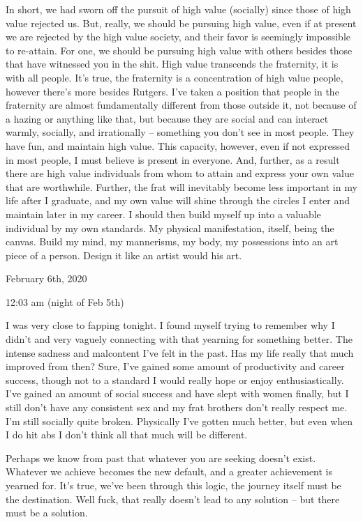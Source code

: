 In short, we had sworn off the pursuit of high value (socially) since
those of high value rejected us. But, really, we should be pursuing high
value, even if at present we are rejected by the high value society, and
their favor is seemingly impossible to re-attain. For one, we should be
pursuing high value with others besides those that have witnessed you in
the shit. High value transcends the fraternity, it is with all people.
It's true, the fraternity is a concentration of high value people,
however there's more besides Rutgers. I've taken a position that people
in the fraternity are almost fundamentally different from those outside
it, not because of a hazing or anything like that, but because they are
social and can interact warmly, socially, and irrationally -- something
you don't see in most people. They have fun, and maintain high value.
This capacity, however, even if not expressed in most people, I must
believe is present in everyone. And, further, as a result there are high
value individuals from whom to attain and express your own value that
are worthwhile. Further, the frat will inevitably become less important
in my life after I graduate, and my own value will shine through the
circles I enter and maintain later in my career. I should then build
myself up into a valuable individual by my own standards. My physical
manifestation, itself, being the canvas. Build my mind, my mannerisms,
my body, my possessions into an art piece of a person. Design it like an
artist would his art.

\bigskip
\bigskip
February 6th, 2020

12:03 am (night of Feb 5th)

I was very close to fapping tonight. I found myself trying to remember
why I didn't and very vaguely connecting with that yearning for
something better. The intense sadness and malcontent I've felt in the
past. Has my life really that much improved from then? Sure, I've gained
some amount of productivity and career success, though not to a standard
I would really hope or enjoy enthusiastically. I've gained an amount of
social success and have slept with women finally, but I still don't have
any consistent sex and my frat brothers don't really respect me. I'm
still socially quite broken. Physically I've gotten much better, but
even when I do hit abs I don't think all that much will be different.

\qquad Perhaps we know from past that whatever you are seeking doesn't
exist. Whatever we achieve becomes the new default, and a greater
achievement is yearned for. It's true, we've been through this logic,
the journey itself must be the destination. Well fuck, that really
doesn't lead to any solution -- but there must be a solution.

